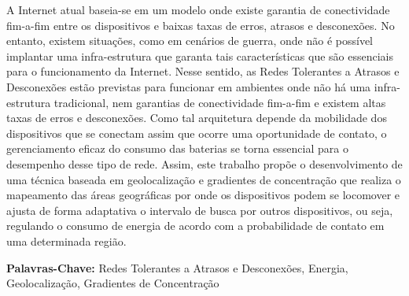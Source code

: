 \documentclass[brazil]{abnt-UVV/abnt-uvv}
\begin{document}
\begin{resumo} 

A Internet atual baseia-se em um modelo onde existe garantia de conectividade fim-a-fim entre os dispositivos e baixas taxas de erros, atrasos e desconexões. No entanto, existem situações, como em cenários de guerra, onde não é possível implantar uma infra-estrutura que garanta tais características que são essenciais para o funcionamento da Internet. Nesse sentido, as Redes Tolerantes a Atrasos e Desconexões estão previstas para funcionar em ambientes onde não há uma infra-estrutura tradicional, nem garantias de conectividade fim-a-fim e existem altas taxas de erros e desconexões. Como tal arquitetura depende da mobilidade dos dispositivos que se conectam assim que ocorre uma oportunidade de contato, o gerenciamento eficaz do consumo das baterias se torna essencial para o desempenho desse tipo de rede. Assim, este trabalho propõe o desenvolvimento de uma técnica baseada em geolocalização e gradientes de concentração que realiza o mapeamento das áreas geográficas por onde os dispositivos podem se locomover e ajusta de forma adaptativa o intervalo de busca por outros dispositivos, ou seja, regulando o consumo de energia de acordo com a probabilidade de contato em uma determinada região.

\textbf{Palavras-Chave:} Redes Tolerantes a Atrasos e Desconexões, Energia, Geolocalização, Gradientes de Concentração
\end{resumo}
\end{document}
